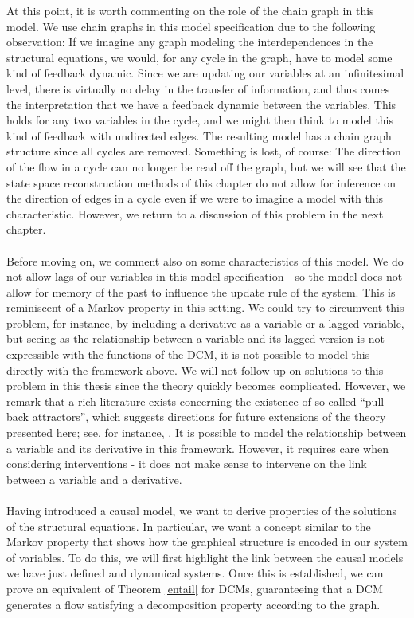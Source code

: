 \documentclass[11pt, a4paper]{memoir}
\theoremstyle{break}
\theoremstyle{break}
\theoremstyle{nonumberplain}
\begin{document}
At this point, it is worth commenting on the role of the chain graph in this model. We use chain graphs in this model specification due to the following observation: If we imagine any graph modeling the interdependences in the structural equations, we would, for any cycle in the graph, have to model some kind of feedback dynamic. Since we are updating our variables at an infinitesimal level, there is virtually no delay in the transfer of information, and thus comes the interpretation that we have a feedback dynamic between the variables. This holds for any two variables in the cycle, and we might then think to model this kind of feedback with undirected edges. The resulting model has a chain graph structure since all cycles are removed. Something is lost, of course: The direction of the flow in a cycle can no longer be read off the graph, but we will see that the state space reconstruction methods of this chapter do not allow for inference on the direction of edges in a cycle even if we were to imagine a model with this characteristic. However, we return to a discussion of this problem in the next chapter.\\\\
Before moving on, we comment also on some characteristics of this model. We do not allow lags of our variables in this model specification - so the model does not allow for memory of the past to influence the update rule of the system. This is reminiscent of a Markov property in this setting. We could try to circumvent this problem, for instance, by including a derivative as a variable or a lagged variable, but seeing as the relationship between a variable and its lagged version is not expressible with the functions of the DCM, it is not possible to model this directly with the framework above.  We will not follow up on solutions to this problem in this thesis since the theory quickly becomes complicated. However, we remark that a rich literature exists concerning the existence of so-called \enquote{pull-back attractors}, which suggests directions for future extensions of the theory presented here; see, for instance, \cite{delayEq}. It is possible to model the relationship between a variable and its derivative in this framework. However, it requires care when considering interventions - it does not make sense to intervene on the link between a variable and a derivative.\\\\
Having introduced a causal model, we want to derive properties of the solutions of the structural equations. In particular, we want a concept similar to the Markov property that shows how the graphical structure is encoded in our system of variables. To do this, we will first highlight the link between the causal models we have just defined and dynamical systems. Once this is established, we can prove an equivalent of Theorem \ref{entail} for DCMs, guaranteeing that a DCM generates a flow satisfying a decomposition property according to the graph.
\end{document}

